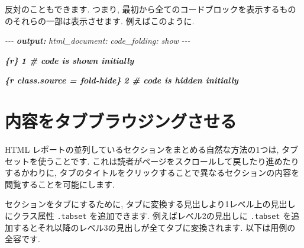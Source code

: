 \documentclass[
  11pt,
]{bxjsreport}
\newenvironment{Shaded}{\begin{snugshade}}{\end{snugshade}}
\newcommand{\AnnotationTok}[1]{\textcolor[rgb]{0.56,0.35,0.01}{\textbf{\textit{#1}}}}
\newcommand{\CommentTok}[1]{\textcolor[rgb]{0.56,0.35,0.01}{\textit{#1}}}
\newcommand{\InformationTok}[1]{\textcolor[rgb]{0.56,0.35,0.01}{\textbf{\textit{#1}}}}
\begin{document}
反対のこともできます. つまり, 最初から全てのコードブロックを表示するもののそれらの一部は表示させます. 例えばこのように.

\begin{Shaded}
\begin{Highlighting}[]
\CommentTok{{-}{-}{-}}
\AnnotationTok{output:}
\CommentTok{  html\_document:}
\CommentTok{    code\_folding: show}
\CommentTok{{-}{-}{-}}

\InformationTok{\textasciigrave{}\textasciigrave{}\textasciigrave{}\{r\}}
\InformationTok{1  \# code is shown initially}
\InformationTok{\textasciigrave{}\textasciigrave{}\textasciigrave{}}

\InformationTok{\textasciigrave{}\textasciigrave{}\textasciigrave{}\{r class.source = \textquotesingle{}fold{-}hide\textquotesingle{}\}}
\InformationTok{2  \# code is hidden initially}
\InformationTok{\textasciigrave{}\textasciigrave{}\textasciigrave{}}
\end{Highlighting}
\end{Shaded}

\hypertarget{html-tabs}{%
\section{内容をタブブラウジングさせる}\label{html-tabs}}

HTML レポートの並列しているセクションをまとめる自然な方法の1つは, タブセットを使うことです. これは読者がページをスクロールして戻したり進めたりするかわりに, タブのタイトルをクリックすることで異なるセクションの内容を閲覧することを可能にします.

セクションをタブにするために, タブに変換する見出しより1レベル上の見出しにクラス属性 \texttt{.tabset} を追加できます. 例えばレベル2の見出しに \texttt{.tabset} を追加するとそれ以降のレベル3の見出しが全てタブに変換されます. 以下は用例の全容です.
\end{document}
